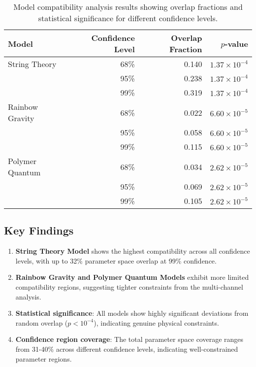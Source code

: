 \documentclass[11pt]{article}
\begin{document}
\begin{table}[H]
\centering
\caption{Model compatibility analysis results showing overlap fractions and statistical significance for different confidence levels.}
\begin{tabular}{@{}lrrr@{}}
\toprule
Model & Confidence Level & Overlap Fraction & $p$-value \\
\midrule
String Theory & 68\% & 0.140 & $1.37 \times 10^{-4}$ \\
              & 95\% & 0.238 & $1.37 \times 10^{-4}$ \\
              & 99\% & 0.319 & $1.37 \times 10^{-4}$ \\
\midrule
Rainbow Gravity & 68\% & 0.022 & $6.60 \times 10^{-5}$ \\
                & 95\% & 0.058 & $6.60 \times 10^{-5}$ \\
                & 99\% & 0.115 & $6.60 \times 10^{-5}$ \\
\midrule
Polymer Quantum & 68\% & 0.034 & $2.62 \times 10^{-5}$ \\
                & 95\% & 0.069 & $2.62 \times 10^{-5}$ \\
                & 99\% & 0.105 & $2.62 \times 10^{-5}$ \\
\bottomrule
\end{tabular}
\end{table}

\subsection{Key Findings}

\begin{enumerate}
    \item \textbf{String Theory Model} shows the highest compatibility across all confidence levels, with up to 32\% parameter space overlap at 99\% confidence.

    \item \textbf{Rainbow Gravity and Polymer Quantum Models} exhibit more limited compatibility regions, suggesting tighter constraints from the multi-channel analysis.

    \item \textbf{Statistical significance}: All models show highly significant deviations from random overlap ($p < 10^{-4}$), indicating genuine physical constraints.

    \item \textbf{Confidence region coverage}: The total parameter space coverage ranges from 31-40\% across different confidence levels, indicating well-constrained parameter regions.
\end{enumerate}
\end{document}
